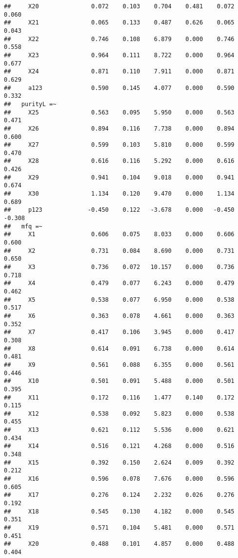 \documentclass[english,man]{apa6}
\theoremstyle{definition}
\theoremstyle{definition}
\theoremstyle{definition}
\theoremstyle{remark}
\begin{document}
\begin{verbatim}
##     X20               0.072    0.103    0.704    0.481    0.072    0.060
##     X21               0.065    0.133    0.487    0.626    0.065    0.043
##     X22               0.746    0.108    6.879    0.000    0.746    0.558
##     X23               0.964    0.111    8.722    0.000    0.964    0.677
##     X24               0.871    0.110    7.911    0.000    0.871    0.629
##     a123              0.590    0.145    4.077    0.000    0.590    0.332
##   purityL =~                                                            
##     X25               0.563    0.095    5.950    0.000    0.563    0.471
##     X26               0.894    0.116    7.738    0.000    0.894    0.600
##     X27               0.599    0.103    5.810    0.000    0.599    0.470
##     X28               0.616    0.116    5.292    0.000    0.616    0.426
##     X29               0.941    0.104    9.018    0.000    0.941    0.674
##     X30               1.134    0.120    9.470    0.000    1.134    0.689
##     p123             -0.450    0.122   -3.678    0.000   -0.450   -0.308
##   mfq =~                                                                
##     X1                0.606    0.075    8.033    0.000    0.606    0.600
##     X2                0.731    0.084    8.690    0.000    0.731    0.650
##     X3                0.736    0.072   10.157    0.000    0.736    0.718
##     X4                0.479    0.077    6.243    0.000    0.479    0.462
##     X5                0.538    0.077    6.950    0.000    0.538    0.517
##     X6                0.363    0.078    4.661    0.000    0.363    0.352
##     X7                0.417    0.106    3.945    0.000    0.417    0.308
##     X8                0.614    0.091    6.738    0.000    0.614    0.481
##     X9                0.561    0.088    6.355    0.000    0.561    0.446
##     X10               0.501    0.091    5.488    0.000    0.501    0.395
##     X11               0.172    0.116    1.477    0.140    0.172    0.115
##     X12               0.538    0.092    5.823    0.000    0.538    0.455
##     X13               0.621    0.112    5.536    0.000    0.621    0.434
##     X14               0.516    0.121    4.268    0.000    0.516    0.348
##     X15               0.392    0.150    2.624    0.009    0.392    0.212
##     X16               0.596    0.078    7.676    0.000    0.596    0.605
##     X17               0.276    0.124    2.232    0.026    0.276    0.192
##     X18               0.545    0.130    4.182    0.000    0.545    0.351
##     X19               0.571    0.104    5.481    0.000    0.571    0.451
##     X20               0.488    0.101    4.857    0.000    0.488    0.404

\end{verbatim}
\end{document}
